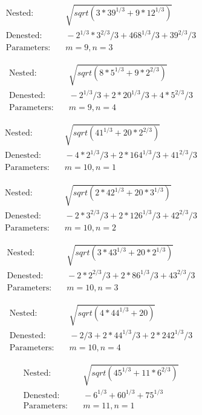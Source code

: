 \begin{align*}
\text{Nested:} &\quad \sqrt{sqrt(3*39^{1/3} + 9*12^{1/3})} \\
\text{Denested:} &\quad -2^{1/3}*3^{2/3}/3 + 468^{1/3}/3 + 39^{2/3}/3 \\
\text{Parameters:} &\quad m=9, n=3
\end{align*}

\begin{align*}
\text{Nested:} &\quad \sqrt{sqrt(8*5^{1/3} + 9*2^{2/3})} \\
\text{Denested:} &\quad -2^{1/3}/3 + 2*20^{1/3}/3 + 4*5^{2/3}/3 \\
\text{Parameters:} &\quad m=9, n=4
\end{align*}

\begin{align*}
\text{Nested:} &\quad \sqrt{sqrt(41^{1/3} + 20*2^{2/3})} \\
\text{Denested:} &\quad -4*2^{1/3}/3 + 2*164^{1/3}/3 + 41^{2/3}/3 \\
\text{Parameters:} &\quad m=10, n=1
\end{align*}

\begin{align*}
\text{Nested:} &\quad \sqrt{sqrt(2*42^{1/3} + 20*3^{1/3})} \\
\text{Denested:} &\quad -2*3^{2/3}/3 + 2*126^{1/3}/3 + 42^{2/3}/3 \\
\text{Parameters:} &\quad m=10, n=2
\end{align*}

\begin{align*}
\text{Nested:} &\quad \sqrt{sqrt(3*43^{1/3} + 20*2^{1/3})} \\
\text{Denested:} &\quad -2*2^{2/3}/3 + 2*86^{1/3}/3 + 43^{2/3}/3 \\
\text{Parameters:} &\quad m=10, n=3
\end{align*}

\begin{align*}
\text{Nested:} &\quad \sqrt{sqrt(4*44^{1/3} + 20)} \\
\text{Denested:} &\quad -2/3 + 2*44^{1/3}/3 + 2*242^{1/3}/3 \\
\text{Parameters:} &\quad m=10, n=4
\end{align*}

\begin{align*}
\text{Nested:} &\quad \sqrt{sqrt(45^{1/3} + 11*6^{2/3})} \\
\text{Denested:} &\quad -6^{1/3} + 60^{1/3} + 75^{1/3} \\
\text{Parameters:} &\quad m=11, n=1
\end{align*}

